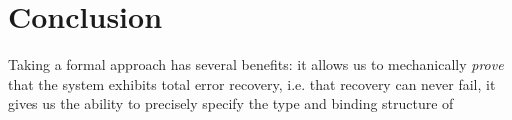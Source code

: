 \section{Conclusion}
\label{sec:conclusion}
Taking a formal approach has several benefits: it allows us to mechanically \emph{prove} that the system exhibits total error recovery, i.e. that recovery can never fail, 
it gives us the ability to precisely specify the type and binding structure of 

